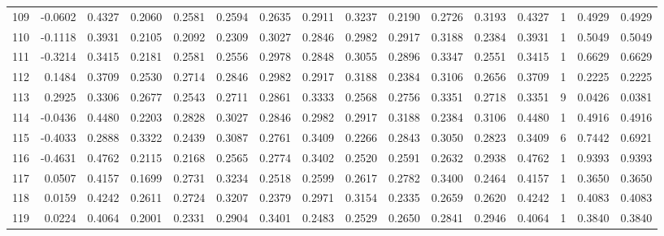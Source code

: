 \begin{tabular}{lrrrrrrrrrrrrrrr}
109 &     -0.0602 &  0.4327 &  0.2060 &  0.2581 &  0.2594 &  0.2635 &  0.2911 &  0.3237 &  0.2190 &  0.2726 &   0.3193 &     0.4327 &      1 &                    0.4929 &                     0.4929 \\
110 &     -0.1118 &  0.3931 &  0.2105 &  0.2092 &  0.2309 &  0.3027 &  0.2846 &  0.2982 &  0.2917 &  0.3188 &   0.2384 &     0.3931 &      1 &                    0.5049 &                     0.5049 \\
111 &     -0.3214 &  0.3415 &  0.2181 &  0.2581 &  0.2556 &  0.2978 &  0.2848 &  0.3055 &  0.2896 &  0.3347 &   0.2551 &     0.3415 &      1 &                    0.6629 &                     0.6629 \\
112 &      0.1484 &  0.3709 &  0.2530 &  0.2714 &  0.2846 &  0.2982 &  0.2917 &  0.3188 &  0.2384 &  0.3106 &   0.2656 &     0.3709 &      1 &                    0.2225 &                     0.2225 \\
113 &      0.2925 &  0.3306 &  0.2677 &  0.2543 &  0.2711 &  0.2861 &  0.3333 &  0.2568 &  0.2756 &  0.3351 &   0.2718 &     0.3351 &      9 &                    0.0426 &                     0.0381 \\
114 &     -0.0436 &  0.4480 &  0.2203 &  0.2828 &  0.3027 &  0.2846 &  0.2982 &  0.2917 &  0.3188 &  0.2384 &   0.3106 &     0.4480 &      1 &                    0.4916 &                     0.4916 \\
115 &     -0.4033 &  0.2888 &  0.3322 &  0.2439 &  0.3087 &  0.2761 &  0.3409 &  0.2266 &  0.2843 &  0.3050 &   0.2823 &     0.3409 &      6 &                    0.7442 &                     0.6921 \\
116 &     -0.4631 &  0.4762 &  0.2115 &  0.2168 &  0.2565 &  0.2774 &  0.3402 &  0.2520 &  0.2591 &  0.2632 &   0.2938 &     0.4762 &      1 &                    0.9393 &                     0.9393 \\
117 &      0.0507 &  0.4157 &  0.1699 &  0.2731 &  0.3234 &  0.2518 &  0.2599 &  0.2617 &  0.2782 &  0.3400 &   0.2464 &     0.4157 &      1 &                    0.3650 &                     0.3650 \\
118 &      0.0159 &  0.4242 &  0.2611 &  0.2724 &  0.3207 &  0.2379 &  0.2971 &  0.3154 &  0.2335 &  0.2659 &   0.2620 &     0.4242 &      1 &                    0.4083 &                     0.4083 \\
119 &      0.0224 &  0.4064 &  0.2001 &  0.2331 &  0.2904 &  0.3401 &  0.2483 &  0.2529 &  0.2650 &  0.2841 &   0.2946 &     0.4064 &      1 &                    0.3840 &                     0.3840 \\

\end{tabular}
